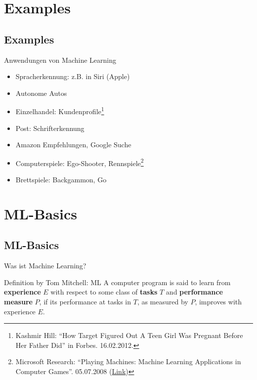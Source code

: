 
\section{Examples}
\subsection{Examples}

\begin{frame}{Anwendungen von Machine Learning}
    \begin{itemize}
        \item Spracherkennung: z.B. in Siri (Apple)
        \item Autonome Autos
        \item Einzelhandel: Kundenprofile\footnote{\tiny Kashmir Hill: \enquote{How Target Figured Out A Teen Girl Was Pregnant Before Her Father Did} in Forbes. 16.02.2012.}
        \item Post: Schrifterkennung
        \item Amazon Empfehlungen, Google Suche
        \item Computerspiele: Ego-Shooter, Rennspiele\footnote{\tiny Microsoft Research: \enquote{Playing Machines: Machine Learning Applications in Computer Games}. 05.07.2008 (\href{http://research.microsoft.com/en-us/projects/mlgames2008/}{Link})}
        \item Brettspiele: Backgammon, Go
    \end{itemize}
\end{frame}



\section{ML-Basics}
\subsection{ML-Basics}

\begin{frame}{Was ist Machine Learning?}
    \begin{block}{Definition by Tom Mitchell: ML}
        A computer program is said to learn from \textbf{experience} $E$ with
        respect to some class of \textbf{tasks} $T$ and \textbf{performance
        measure} $P$, if its performance at tasks in $T$, as measured by $P$,
        improves with experience $E$.
    \end{block}
\end{frame}

